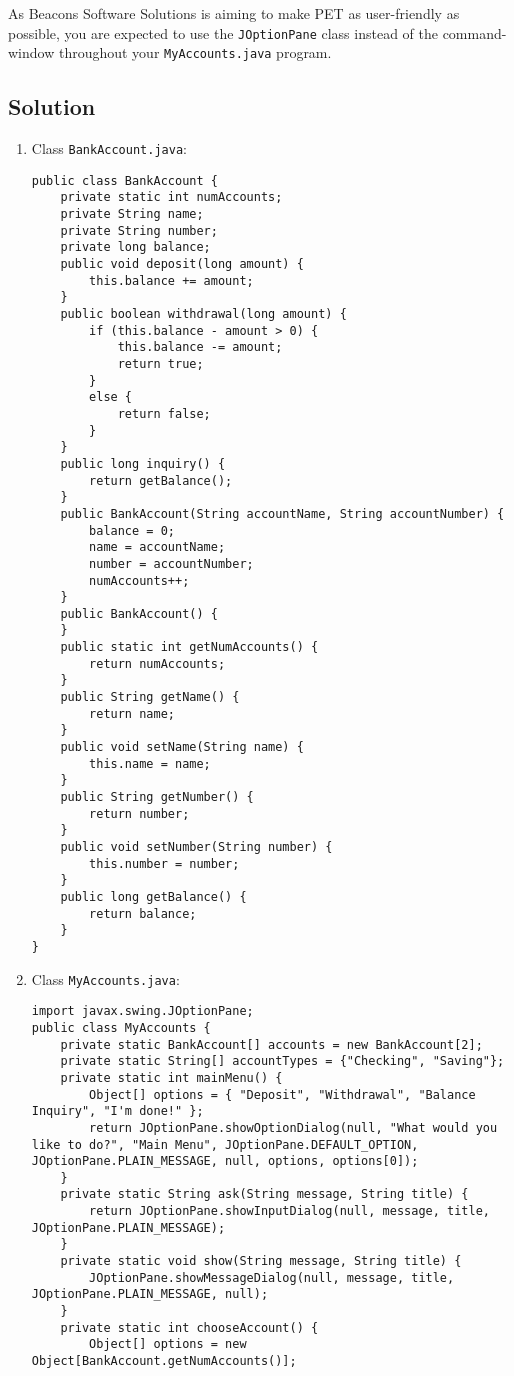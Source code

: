 As Beacons Software Solutions is aiming to make PET as user-friendly as possible, you are expected to use the \texttt{JOptionPane} class instead of the command-window throughout your \texttt{MyAccounts.java} program.

\subsection*{Solution}
\begin{enumerate}
\item Class \texttt{BankAccount.java}:
\lstset{language=java}
\begin{lstlisting}
public class BankAccount {
	private static int numAccounts;
	private String name;
	private String number;
	private long balance;
	public void deposit(long amount) {
		this.balance += amount;
	}
	public boolean withdrawal(long amount) {
		if (this.balance - amount > 0) {
			this.balance -= amount;
			return true;
		}
		else {
			return false;
		}
	}
	public long inquiry() {
		return getBalance();
	}
	public BankAccount(String accountName, String accountNumber) {
		balance = 0;
		name = accountName;
		number = accountNumber;
		numAccounts++;
	}
	public BankAccount() {
	}
	public static int getNumAccounts() {
		return numAccounts;
	}
	public String getName() {
		return name;
	}
	public void setName(String name) {
		this.name = name;
	}
	public String getNumber() {
		return number;
	}
	public void setNumber(String number) {
		this.number = number;
	}
	public long getBalance() {
		return balance;
	}
}
\end{lstlisting}
\item Class \texttt{MyAccounts.java}:
\lstset{language=java}
\begin{lstlisting}
import javax.swing.JOptionPane;
public class MyAccounts {
	private static BankAccount[] accounts = new BankAccount[2];
	private static String[] accountTypes = {"Checking", "Saving"};
	private static int mainMenu() {
		Object[] options = { "Deposit", "Withdrawal", "Balance Inquiry", "I'm done!" };
		return JOptionPane.showOptionDialog(null, "What would you like to do?", "Main Menu", JOptionPane.DEFAULT_OPTION, JOptionPane.PLAIN_MESSAGE, null, options, options[0]);
	}
	private static String ask(String message, String title) {
		return JOptionPane.showInputDialog(null, message, title, JOptionPane.PLAIN_MESSAGE);
	}
	private static void show(String message, String title) {
		JOptionPane.showMessageDialog(null, message, title, JOptionPane.PLAIN_MESSAGE, null);
	}
	private static int chooseAccount() {
		Object[] options = new Object[BankAccount.getNumAccounts()];

\end{lstlisting}
\end{enumerate}
